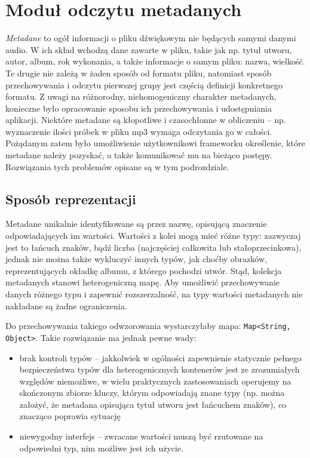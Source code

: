 
\section{Moduł odczytu metadanych}
\label{sec:metadane}

\emph{Metadane} to ogół informacji o pliku dźwiękowym nie będących samymi danymi audio. W ich skład
wchodzą dane zawarte w pliku, takie jak np. tytuł utworu, autor, album, rok wykonania, a także
informacje o samym pliku: nazwa, wielkość. Te drugie nie zależą w żaden sposób od formatu pliku,
natomiast sposób przechowywania i odczytu pierwszej grupy jest częścią definicji konkretnego
formatu. Z uwagi na różnorodny, niehomogeniczny charakter metadanych, konieczne było opracowanie
sposobu ich przechowywania i udostępniania aplikacji. Niektóre metadane są kłopotliwe i czasochłonne
w obliczeniu -- np. wyznaczenie ilości próbek w pliku mp3 wymaga odczytania go w całości. Pożądanym
zatem było umożliwienie użytkownikowi frameworku określenie, które metadane należy pozyskać, a także
komunikować mu na bieżąco postępy. Rozwiązania tych problemów opisane są w tym podrozdziale.

\subsection{Sposób reprezentacji}

Metadane unikalnie identyfikowane są przez nazwę, opisującą znaczenie odpowiadających im wartości.
Wartości z kolei mogą mieć różne typy: zazwyczaj jest to łańcuch znaków, bądź liczba (najczęściej
całkowita lub stałoprzecinkowa), jednak nie można także wykluczyć innych typów, jak choćby obrazków,
reprezentujących okładkę albumu, z którego pochodzi utwór. Stąd, kolekcja metadanych stanowi
heterogeniczną mapę. Aby umożliwić przechowywanie danych różnego typu i zapewnić rozszerzalność, na
typy wartości metadanych nie nakładane są żadne ograniczenia.

Do przechowywania takiego odwzorowania wystarczyłaby mapa: \texttt{Map<String, Object>}. Takie
rozwiązanie ma jednak pewne wady:

\begin{itemize}

  \item brak kontroli typów -- jakkolwiek w ogólności zapewnienie statycznie pełnego bezpieczeństwa
typów dla heterogenicznych kontenerów jest ze zrozumiałych względów niemożliwe, w wielu praktycznych
zastosowaniach operujemy na skończonym zbiorze kluczy, którym odpowiadają znane typy (np. można
założyć, że metadana opisująca tytuł utworu jest łańcuchem znaków), co znacząco poprawia sytuację

  \item niewygodny interfejs -- zwracane wartości muszą być rzutowane na odpowiedni typ, nim możliwe
jest ich użycie.

\end{itemize}

